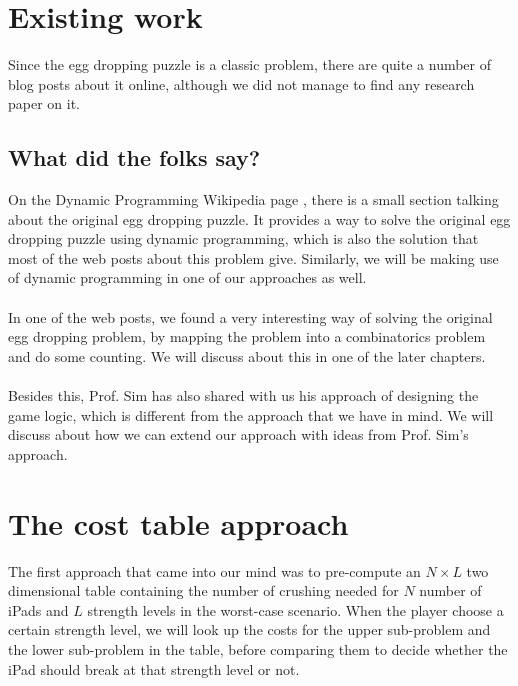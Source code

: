 \documentclass[12pt,a4paper,oneside]{report}
\begin{document}

\chapter{Existing work}
Since the egg dropping puzzle is a classic problem, there are quite a number of blog posts about it online, although we did not manage to find any research paper on it.

\section{What did the folks say?}
On the Dynamic Programming Wikipedia page \cite{dpwiki}, there is a small section talking about the original egg dropping puzzle. It provides a way to solve the original egg dropping puzzle using dynamic programming, which is also the solution that most of the web posts about this problem give. Similarly, we will be making use of dynamic programming in one of our approaches as well. \\\\
In one of the web posts, we found a very interesting way of solving the original egg dropping problem, by mapping the problem into a combinatorics problem and do some counting. We will discuss about this in one of the later chapters. \\\\
Besides this, Prof. Sim has also shared with us his approach of designing the game logic, which is different from the approach that we have in mind. We will discuss about how we can extend our approach with ideas from Prof. Sim's approach. 


\chapter{The cost table approach}
The first approach that came into our mind was to pre-compute an $N \times L$ two dimensional table containing the number of crushing needed for $N$ number of iPads and $L$ strength levels in the worst-case scenario. When the player choose a certain strength level, we will look up the costs for the upper sub-problem and the lower sub-problem in the table, before comparing them to decide whether the iPad should break at that strength level or not.
\end{document}
